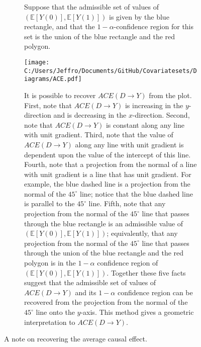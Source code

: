 \documentclass[10pt,a4paper,twoside]{article}
\numberwithin{equation}{section}
\begin{document}
\begin{figure}[p]
\centering
\begin{subfigure}{0.8\textwidth}
\caption{Suppose that the admissible set of values of $(\mathbb{E}[Y(0)],\mathbb{E}[Y(1)])$ is given by the blue rectangle, and that the $1-\alpha$-confidence region for this set is the union of the blue rectangle and the red polygon. }
\texttt{[image: C:/Users/Jeffro/Documents/GitHub/Covariatesets/Diagrams/ACE.pdf]}
\caption{It is possible to recover $ACE(D\rightarrow Y)$ from the plot. First, note that $ACE(D\rightarrow Y)$ is increasing in the $y$-direction and is decreasing in the $x$-direction. Second, note that $ACE(D\rightarrow Y)$ is constant along any line with unit gradient. Third, note that the value of $ACE(D\rightarrow Y)$ along any line with unit gradient is dependent upon the value of the intercept of this line. Fourth, note that a projection from the normal of a line with unit gradient is a line that has unit gradient. For example, the blue dashed line is a projection from the normal of the $45^\circ$ line; notice that the blue dashed line is parallel to the $45^\circ$ line. Fifth, note that any projection from the normal of the $45^\circ$ line that passes through the blue rectangle is an admissible value of $(\mathbb{E}[Y(0)],\mathbb{E}[Y(1)])$; equivalently, that any projection from the normal of the $45^\circ$ line that passes through the union of the blue rectangle and the red polygon is in the $1-\alpha$ confidence region of $(\mathbb{E}[Y(0)],\mathbb{E}[Y(1)])$. Together these five facts suggest that the admissible set of values of $ACE(D\rightarrow Y)$ and its $1-\alpha$ confidence region can be recovered from the projection from the normal of the $45^\circ$ line onto the $y$-axis. This method gives a geometric interpretation to $ACE(D\rightarrow Y)$.}
\end{subfigure}
\caption{A note on recovering the average causal effect.}
\label{fig:ace}
\end{figure}
\end{document}
